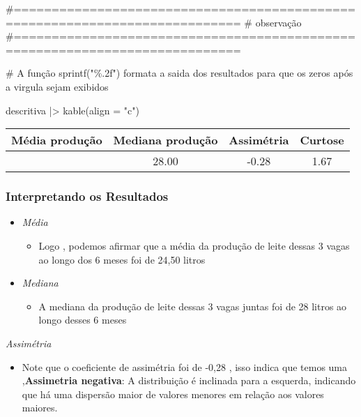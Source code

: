 \documentclass[
  letterpaper,
  DIV=11,
  numbers=noendperiod]{scrartcl}
\newenvironment{Shaded}{\begin{snugshade}}{\end{snugshade}}
\newcommand{\AttributeTok}[1]{\textcolor[rgb]{0.40,0.45,0.13}{#1}}
\newcommand{\CommentTok}[1]{\textcolor[rgb]{0.37,0.37,0.37}{#1}}
\newcommand{\FunctionTok}[1]{\textcolor[rgb]{0.28,0.35,0.67}{#1}}
\newcommand{\NormalTok}[1]{\textcolor[rgb]{0.00,0.23,0.31}{#1}}
\newcommand{\SpecialCharTok}[1]{\textcolor[rgb]{0.37,0.37,0.37}{#1}}
\newcommand{\StringTok}[1]{\textcolor[rgb]{0.13,0.47,0.30}{#1}}
\providecommand{\tightlist}{%
  \setlength{\itemsep}{0pt}\setlength{\parskip}{0pt}}\usepackage{longtable,booktabs,array}
\begin{document}
\begin{Shaded}
\begin{Highlighting}[]
\CommentTok{\#============================================================================}
\CommentTok{\#                   observação}
\CommentTok{\#============================================================================}


\CommentTok{\# A função sprintf("\%.2f") formata a saida dos resultados para que os zeros após a virgula sejam exibidos }


\NormalTok{descritiva }\SpecialCharTok{|\textgreater{}} \FunctionTok{kable}\NormalTok{(}\AttributeTok{align =} \StringTok{"c"}\NormalTok{)}
\end{Highlighting}
\end{Shaded}

\begin{longtable}[]{@{}cccc@{}}
\toprule\noalign{}
Média produção & Mediana produção & Assimétria & Curtose \\
\midrule\noalign{}
\endhead
\bottomrule\noalign{}
\endlastfoot
24.50 & 28.00 & -0.28 & 1.67 \\
\end{longtable}

\subsubsection{Interpretando os
Resultados}\label{interpretando-os-resultados}

\begin{itemize}
\item
  \emph{Média}

  \begin{itemize}
  \tightlist
  \item
    Logo , podemos afirmar que a média da produção de leite dessas 3
    vagas ao longo dos 6 meses foi de 24,50 litros
  \end{itemize}
\item
  \emph{Mediana}

  \begin{itemize}
  \tightlist
  \item
    A mediana da produção de leite dessas 3 vagas juntas foi de 28
    litros ao longo desses 6 meses
  \end{itemize}
\end{itemize}

\emph{Assimétria}

\begin{itemize}
\tightlist
\item
  Note que o coeficiente de assimétria foi de -0,28 , isso indica que
  temos uma ,\textbf{Assimetria negativa}: A distribuição é inclinada
  para a esquerda, indicando que há uma dispersão maior de valores
  menores em relação aos valores maiores.
\end{itemize}
\end{document}
